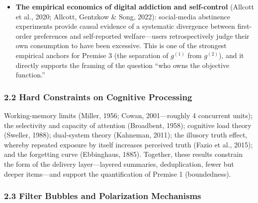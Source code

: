 \documentclass[
  11pt]{article}
\begin{document}
\begin{itemize}
  the marginal value theorem. The theory explains the addictiveness of
  algorithmic feeds, but it is descriptive rather than normative;
  Section 8.3 of this paper elevates it into a normative scheduling
  rule.
\item
  \textbf{The empirical economics of digital addiction and self-control}
  (Allcott et al., 2020; Allcott, Gentzkow \& Song, 2022): social-media
  abstinence experiments provide causal evidence of a systematic
  divergence between first-order preferences and self-reported
  welfare---users retrospectively judge their own consumption to have
  been excessive. This is one of the strongest empirical anchors for
  Premise 3 (the separation of \(g^{(1)}\) from \(g^{(2)}\)), and it
  directly supports the framing of the question ``who owns the objective
  function.''
\end{itemize}

\subsubsection{2.2 Hard Constraints on Cognitive
Processing}\label{hard-constraints-on-cognitive-processing}

Working-memory limits (Miller, 1956; Cowan, 2001---roughly 4 concurrent
units); the selectivity and capacity of attention (Broadbent, 1958);
cognitive load theory (Sweller, 1988); dual-system theory (Kahneman,
2011); the illusory truth effect, whereby repeated exposure by itself
increases perceived truth (Fazio et al., 2015); and the forgetting curve
(Ebbinghaus, 1885). Together, these results constrain the form of the
delivery layer---layered summaries, deduplication, fewer but deeper
items---and support the quantification of Premise 1 (boundedness).

\subsubsection{2.3 Filter Bubbles and Polarization
Mechanisms}\label{filter-bubbles-and-polarization-mechanisms}
\end{document}

